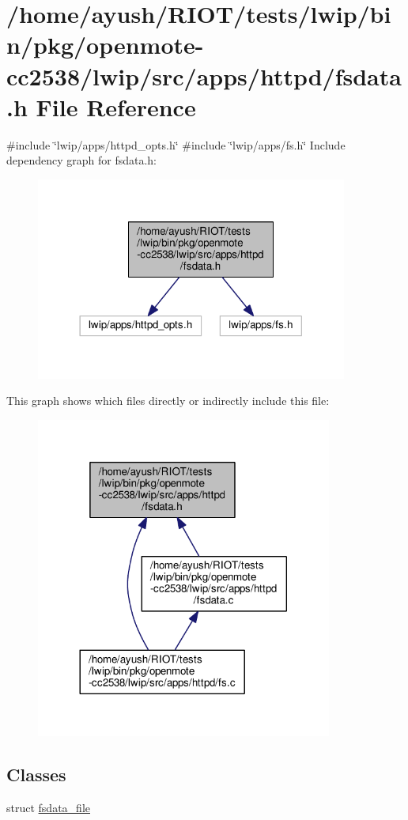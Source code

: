 \hypertarget{openmote-cc2538_2lwip_2src_2apps_2httpd_2fsdata_8h}{}\section{/home/ayush/\+R\+I\+O\+T/tests/lwip/bin/pkg/openmote-\/cc2538/lwip/src/apps/httpd/fsdata.h File Reference}
\label{openmote-cc2538_2lwip_2src_2apps_2httpd_2fsdata_8h}
{\ttfamily \#include \char`\"{}lwip/apps/httpd\+\_\+opts.\+h\char`\"{}}\newline
{\ttfamily \#include \char`\"{}lwip/apps/fs.\+h\char`\"{}}\newline
Include dependency graph for fsdata.\+h\+:
\nopagebreak
\begin{figure}[H]
\begin{center}
\leavevmode
\includegraphics[width=290pt]{openmote-cc2538_2lwip_2src_2apps_2httpd_2fsdata_8h__incl}
\end{center}
\end{figure}
This graph shows which files directly or indirectly include this file\+:
\nopagebreak
\begin{figure}[H]
\begin{center}
\leavevmode
\includegraphics[width=276pt]{openmote-cc2538_2lwip_2src_2apps_2httpd_2fsdata_8h__dep__incl}
\end{center}
\end{figure}
\subsection*{Classes}
\begin{DoxyCompactItemize}
\item 
struct \hyperlink{structfsdata__file}{fsdata\+\_\+file}
\end{DoxyCompactItemize}

